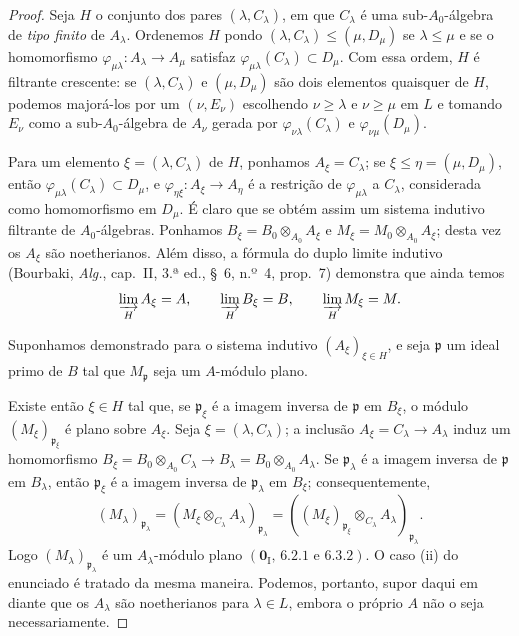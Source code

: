 \begin{proof}
Seja $H$ o conjunto dos pares $(\lambda,C_\lambda)$, em que $C_\lambda$ é uma sub-$A_0$-álgebra de \emph{tipo finito} de $A_\lambda$. Ordenemos $H$ pondo $(\lambda,C_\lambda)\leq(\mu,D_\mu)$ se $\lambda\leq\mu$ e se o homomorfismo $\varphi_{\mu\lambda}:A_\lambda\to A_\mu$ satisfaz $\varphi_{\mu\lambda}(C_\lambda)\subset D_\mu$. Com essa ordem, $H$ é filtrante crescente: se $(\lambda,C_\lambda)$ e $(\mu,D_\mu)$ são dois elementos quaisquer de $H$, podemos majorá-los por um $(\nu,E_\nu)$ escolhendo $\nu\geq\lambda$ e $\nu\geq\mu$ em $L$ e tomando $E_\nu$ como a sub-$A_0$-álgebra de $A_\nu$ gerada por $\varphi_{\nu\lambda}(C_\lambda)$ e $\varphi_{\nu\mu}(D_\mu)$.

Para um elemento $\xi=(\lambda,C_\lambda)$ de $H$, ponhamos $A_\xi=C_\lambda$; se $\xi\leq\eta=(\mu,D_\mu)$, então $\varphi_{\mu\lambda}(C_\lambda)\subset D_\mu$, e $\varphi_{\eta\xi}:A_\xi\to A_\eta$ é a restrição de $\varphi_{\mu\lambda}$ a $C_\lambda$, considerada como homomorfismo em $D_\mu$. É claro que se obtém assim um sistema indutivo filtrante de $A_0$-álgebras. Ponhamos $B_\xi=B_0\otimes_{A_0}A_\xi$ e $M_\xi=M_0\otimes_{A_0}A_\xi$; desta vez os $A_\xi$ são noetherianos. Além disso, a fórmula do duplo limite indutivo (Bourbaki, \emph{Alg.}, cap.~II, 3.ª ed., \S~6, n.º~4, prop.~7) demonstra que ainda temos
\[
\varinjlim_H A_\xi=A,\qquad
\varinjlim_H B_\xi=B,\qquad
\varinjlim_H M_\xi=M.
\]

Suponhamos demonstrado  para o sistema indutivo $(A_\xi)_{\xi\in H}$, e seja $\mathfrak p$ um ideal primo de $B$ tal que $M_{\mathfrak p}$ seja um $A$-módulo plano.


Existe então $\xi\in H$ tal que, se $\mathfrak p_\xi$ é a imagem inversa de $\mathfrak p$ em $B_\xi$, o módulo $(M_\xi)_{\mathfrak p_\xi}$ é plano sobre $A_\xi$. Seja $\xi=(\lambda,C_\lambda)$; a inclusão $A_\xi=C_\lambda\to A_\lambda$ induz um homomorfismo $B_\xi=B_0\otimes_{A_0}C_\lambda\to B_\lambda=B_0\otimes_{A_0}A_\lambda$. Se $\mathfrak p_\lambda$ é a imagem inversa de $\mathfrak p$ em $B_\lambda$, então $\mathfrak p_\xi$ é a imagem inversa de $\mathfrak p_\lambda$ em $B_\xi$; consequentemente,
\[
(M_\lambda)_{\mathfrak p_\lambda}
=(M_\xi\otimes_{C_\lambda}A_\lambda)_{\mathfrak p_\lambda}
=((M_\xi)_{\mathfrak p_\xi}\otimes_{C_\lambda}A_\lambda)_{\mathfrak p_\lambda}.
\]
Logo $(M_\lambda)_{\mathfrak p_\lambda}$ é um $A_\lambda$-módulo plano $(\mathbf 0_{\mathrm I},\,6.2.1\text{ e }6.3.2)$. O caso (ii) do enunciado é tratado da mesma maneira. Podemos, portanto, supor daqui em diante que os $A_\lambda$ são noetherianos para $\lambda\in L$, embora o próprio $A$ não o seja necessariamente.


\end{proof}
